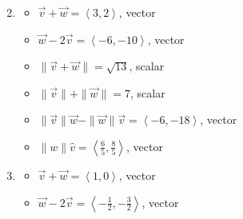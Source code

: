 \begin{enumerate}
\begin{multicols}{2}
\begin{itemize}
\end{itemize}

\end{multicols}

\item  

\begin{multicols}{2}

\begin{itemize}

\item  $\vec{v} + \vec{w} = \left<3,2\right> $, vector
\item  $\vec{w}  - 2\vec{v}  = \left<-6, -10 \right>$, vector

\end{itemize}

\end{multicols}

\begin{multicols}{2}

\begin{itemize}

\item $\| \vec{v} + \vec{w} \| = \sqrt{13}$, scalar
\item  $\| \vec{v} \| + \| \vec{w}\| = 7$, scalar

\end{itemize}

\end{multicols}

\begin{multicols}{2}

\begin{itemize}

\item $\| \vec{v} \| \vec{w} - \| \vec{w} \| \vec{v}  = \left<-6,-18\right>$, vector
\item $\|w\| \hat{v}= \left<\frac{6}{5}, \frac{8}{5}\right>$, vector

\end{itemize}

\end{multicols}

\item  

\begin{multicols}{2}

\begin{itemize}

\item  $\vec{v} + \vec{w} = \left<1,0\right> $, vector
\item  $\vec{w}  - 2\vec{v}  = \left<-\frac{1}{2}, -\frac{3}{2} \right>$, vector


\end{itemize}
\end{multicols}
\end{enumerate}
